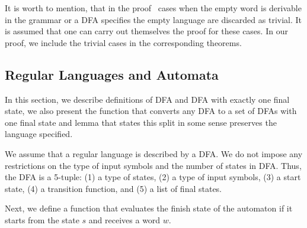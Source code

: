 It is worth to mention, that in the proof~\cite{beigelproof} cases when the empty word is derivable in the grammar or a DFA specifies the empty language are discarded as trivial.
It is assumed that one can carry out themselves the proof for these cases.
In our proof, we include the trivial cases in the corresponding theorems.

\subsection{Regular Languages and Automata}

In this section, we describe definitions of DFA and DFA with exactly one final state, we also present the function that converts any DFA to a set of DFAs with one final state and lemma that states this split in some sense preserves the language specified.

We assume that a regular language is described by a DFA. We do not impose any restrictions on the type of input symbols and the number of states in DFA. Thus, the DFA is a 5-tuple: (1) a type of states, (2) a type of input symbols, (3) a start state, (4) a transition function, and (5) a list of final states.


Next, we define a function that evaluates the finish state of the automaton if it starts from the state $s$ and receives a word $w$.



